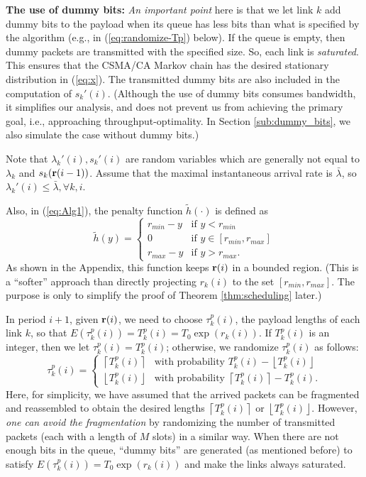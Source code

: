 \documentclass{IEEEtran}
\begin{document}
\textbf{The use of dummy bits:}\emph{ An important point} here is
that we let link $k$ add dummy bits to the payload when its queue
has less bits than what is specified by the algorithm (e.g., in (\ref{eq:randomize-Tp})
below). If the queue is empty, then dummy packets are transmitted
with the specified size. So, each link is \emph{saturated}. This ensures
that the CSMA/CA Markov chain has the desired stationary distribution
in (\ref{eq:x}). The transmitted dummy bits are also included in
the computation of $s_{k}'(i)$. (Although the use of dummy bits consumes
bandwidth, it simplifies our analysis, and does not prevent us from
achieving the primary goal, i.e., approaching throughput-optimality.
In Section \ref{sub:dummy_bits}, we also simulate the case without
dummy bits.) 

Note that $\lambda_{k}'(i),s_{k}'(i)$ are random variables which
are generally not equal to $\lambda_{k}$ and $s_{k}({\bf r}(i-1))$.
Assume that the maximal instantaneous arrival rate is $\bar{\lambda}$,
so $\lambda_{k}'(i)\le\bar{\lambda},\forall k,i$. 

Also, in (\ref{eq:Alg1}), the penalty function $\tilde{h}(\cdot)$
is defined as \begin{equation}
\tilde{h}(y)=\begin{cases}
r_{min}-y & \text{if }y<r_{min}\\
0 & \text{if }y\in[r_{min},r_{max}]\\
r_{max}-y & \text{if }y>r_{max}.\end{cases}\label{eq:h}\end{equation}
As shown in the Appendix, this function keeps ${\bf r}(i)$ in a bounded
region. (This is a {}``softer'' approach than directly projecting
$r_{k}(i)$ to the set $[r_{min},r_{max}]$. The purpose is only to
simplify the proof of Theorem \ref{thm:scheduling} later.)

In period $i+1$, given ${\bf r}(i)$, we need to choose $\tau_{k}^{p}(i)$,
the payload lengths of each link $k$, so that $E(\tau_{k}^{p}(i))=T_{k}^{p}(i)=T_{0}\exp(r_{k}(i))$.
If $T_{k}^{p}(i)$ is an integer, then we let $\tau_{k}^{p}(i)=T_{k}^{p}(i)$;
otherwise, we randomize $\tau_{k}^{p}(i)$ as follows: \begin{equation}
\tau_{k}^{p}(i)=\begin{cases}
\left\lceil T_{k}^{p}(i)\right\rceil  & \text{with probability }T_{k}^{p}(i)-\left\lfloor T_{k}^{p}(i)\right\rfloor \\
\left\lfloor T_{k}^{p}(i)\right\rfloor  & \text{with probability }\left\lceil T_{k}^{p}(i)\right\rceil -T_{k}^{p}(i).\end{cases}\label{eq:randomize-Tp}\end{equation}
Here, for simplicity, we have assumed that the arrived packets can
be fragmented and reassembled to obtain the desired lengths $\left\lceil T_{k}^{p}(i)\right\rceil $
or $\left\lfloor T_{k}^{p}(i)\right\rfloor $. However, \emph{one
can avoid the fragmentation} by randomizing the number of transmitted
packets (each with a length of $M$ slots) in a similar way. When
there are not enough bits in the queue, {}``dummy bits'' are generated
(as mentioned before) to satisfy $E(\tau_{k}^{p}(i))=T_{0}\exp(r_{k}(i))$
and make the links always saturated. \medskip{}
\end{document}
